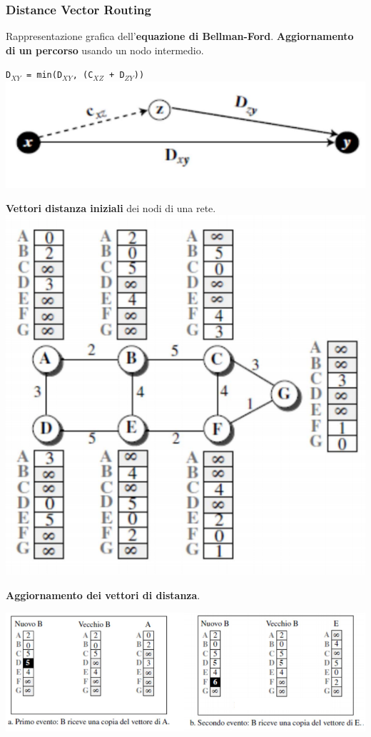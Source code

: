 \documentclass[10pt]{article}
\begin{document}
\subsubsection{Distance Vector Routing}
\begin{multicols}{2}
Rappresentazione grafica dell'\textbf{equazione di Bellman-Ford}. \textbf{Aggiornamento di un percorso} usando un nodo intermedio.
\begin{center}
\texttt{D$_{XY}$ = min(D$_{XY}$, (C$_{XZ}$ + D$_{ZY}$))}\\
\includegraphics[scale=0.5]{bellmanford.png}
\end{center}
\columnbreak
\textbf{Vettori distanza iniziali} dei nodi di una rete.\\
\includegraphics[scale=0.5]{vettoriiniziali.png}
\end{multicols}
\textbf{Aggiornamento dei vettori di distanza}.
\begin{center}
\includegraphics[scale=0.7]{vectorroutingaggiornamento.png}
\end{center}
\end{document}
